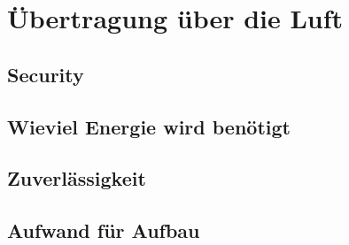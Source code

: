 \chapter{Übertragung über die Luft}
\section{Security}
\section{Wieviel Energie wird benötigt}
\section{Zuverlässigkeit}
\section{Aufwand für Aufbau}

